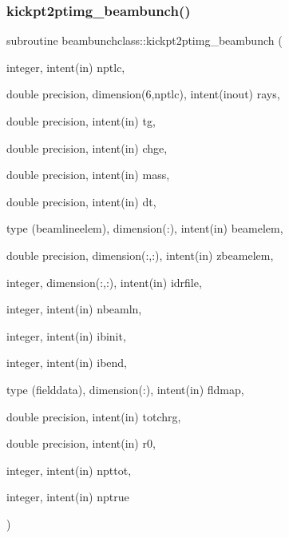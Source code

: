 \subsubsection{\texorpdfstring{kickpt2ptimg\_beambunch()}{kickpt2ptimg\_beambunch()}}
{\footnotesize\ttfamily subroutine beambunchclass\+::kickpt2ptimg\+\_\+beambunch (\begin{DoxyParamCaption}\item[{integer, intent(in)}]{nptlc,  }\item[{double precision, dimension(6,nptlc), intent(inout)}]{rays,  }\item[{double precision, intent(in)}]{tg,  }\item[{double precision, intent(in)}]{chge,  }\item[{double precision, intent(in)}]{mass,  }\item[{double precision, intent(in)}]{dt,  }\item[{type (beamlineelem), dimension(\+:), intent(in)}]{beamelem,  }\item[{double precision, dimension(\+:,\+:), intent(in)}]{zbeamelem,  }\item[{integer, dimension(\+:,\+:), intent(in)}]{idrfile,  }\item[{integer, intent(in)}]{nbeamln,  }\item[{integer, intent(in)}]{ibinit,  }\item[{integer, intent(in)}]{ibend,  }\item[{type (fielddata), dimension(\+:), intent(in)}]{fldmap,  }\item[{double precision, intent(in)}]{totchrg,  }\item[{double precision, intent(in)}]{r0,  }\item[{integer, intent(in)}]{npttot,  }\item[{integer, intent(in)}]{nptrue }\end{DoxyParamCaption})}

